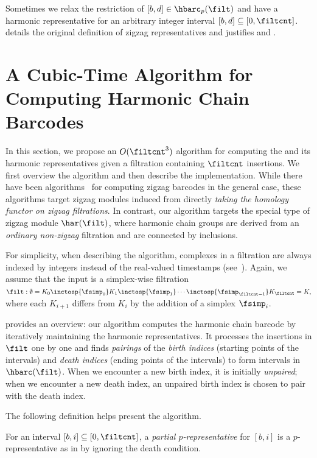 Sometimes we relax the restriction of $[b,d]\in\hbarc_p(\filt)$ 
and have a harmonic representative for an arbitrary integer interval $[b,d]\subseteq[0,\filtcnt]$.
 details the original definition of zigzag representatives
and justifies  and . 
\section{A Cubic-Time Algorithm for Computing Harmonic Chain Barcodes}\label{sec:algorithm}
In this section, we propose an $O(\filtcnt^3)$ algorithm for computing the {\hcb}  and its harmonic representatives given a filtration containing $\filtcnt$ insertions.
We first overview the algorithm and then describe the implementation.
While there have been algorithms~\cite{CarlssonSilvaMorozov2009,zzrep,maria2015zigzag} for computing zigzag barcodes in the general case, these algorithms target zigzag modules induced from directly \emph{taking the homology functor on zigzag filtrations}.
In contrast, our algorithm targets the special type of zigzag module $\har(\filt)$, where harmonic chain groups are derived from an \emph{ordinary non-zigzag} filtration and
are connected by inclusions.

For simplicity, when describing the algorithm, complexes in a filtration are always 
indexed by integers instead of the real-valued timestamps (see~).
Again, we assume that the input is a simplex-wise filtration 
$\filt: 
\emptyset
=K_0 \inctosp{\fsimp_0} K_1 \inctosp{\fsimp_1} 
\cdots \inctosp{\fsimp_{\filtcnt-1}} K_\filtcnt=K,
$
where each $K_{i+1}$ differs from $K_i$ by the addition of a simplex $\fsimp_i$. 

 provides an overview: our algorithm computes the harmonic chain barcode by iteratively maintaining the harmonic representatives. 
It processes the insertions in $\filt$ one by one and finds \emph{pairings} of the \emph{birth indices} (starting points of the intervals) and \emph{death indices} (ending points of the intervals) to form intervals in $\hbarc(\filt)$. 
When we encounter a new birth index, it is initially \emph{unpaired};
when we encounter a new death index, an unpaired birth index is chosen to pair with the death index. 

The following definition helps present the algorithm.
\begin{definition}
For an interval $[b,i] \subseteq [0,\filtcnt]$,
a \emph{partial $p$-representative} for $[b,i]$ is a $p$-representative as in 
by ignoring the death condition.
\end{definition}

